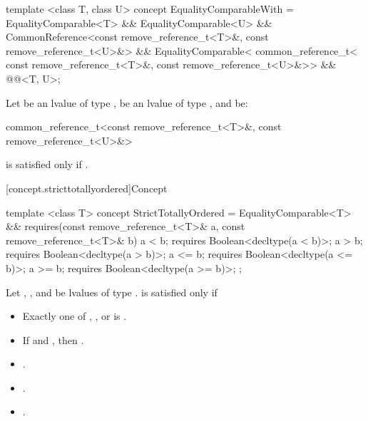 %
\begin{itemdecl}
template <class T, class U>
concept EqualityComparableWith =
  EqualityComparable<T> && EqualityComparable<U> &&
  CommonReference<const remove_reference_t<T>&, const remove_reference_t<U>&> &&
  EqualityComparable<
    common_reference_t<
      const remove_reference_t<T>&,
      const remove_reference_t<U>&>> &&
  @@<T, U>;
\end{itemdecl}

\begin{itemdescr}
\pnum
Let  be an lvalue of type ,
 be an lvalue of type ,
and  be:
\begin{codeblock}
common_reference_t<const remove_reference_t<T>&, const remove_reference_t<U>&>
\end{codeblock}
 is satisfied only if
.
\end{itemdescr}

[concept.stricttotallyordered]{Concept }

%
\begin{itemdecl}
template <class T>
concept StrictTotallyOrdered = EqualityComparable<T> &&
  requires(const remove_reference_t<T>& a,
           const remove_reference_t<T>& b) {
    a <  b; requires Boolean<decltype(a <  b)>;
    a >  b; requires Boolean<decltype(a >  b)>;
    a <= b; requires Boolean<decltype(a <= b)>;
    a >= b; requires Boolean<decltype(a >= b)>;
  };
\end{itemdecl}

\begin{itemdescr}
\pnum
Let , , and  be lvalues of type
.
 is satisfied only if

\begin{itemize}
\item Exactly one of , , or
       is .
\item If  and , then
      .
\item {}.
\item {}.
\item {}.
\end{itemize}

\end{itemdescr}

